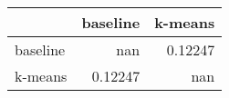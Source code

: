 \begin{tabular}{lrr}
\toprule
          &   baseline &   k-means \\
\midrule
 baseline &  nan       &   0.12247 \\
 k-means  &    0.12247 & nan       \\
\bottomrule
\end{tabular}